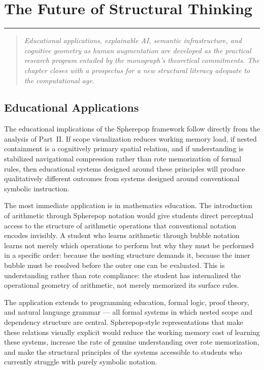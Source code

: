 \documentclass[12pt,openany]{book}
\theoremstyle{plain}
\theoremstyle{definition}
\theoremstyle{remark}
\newcommand{\chapterrule}{%
  \vspace{4pt}%
  {\color{SpherepopBlue}\rule{\textwidth}{0.8pt}}%
  \vspace{10pt}%
}
\newenvironment{chapterprecis}{%
  \begin{quote}\small\itshape}{%
  \end{quote}\medskip}
\begin{document}
\chapter{The Future of Structural Thinking}
\chapterrule

\begin{chapterprecis}
Educational applications, explainable AI, semantic
infrastructure, and cognitive geometry as human augmentation are
developed as the practical research program entailed by the
monograph's theoretical commitments. The chapter closes with a
prospectus for a new structural literacy adequate to the
computational age.
\end{chapterprecis}

\section{Educational Applications}

The educational implications of the Spherepop framework follow directly from the analysis of Part~II. If scope visualization reduces working memory load, if nested containment is a cognitively primary spatial relation, and if understanding is stabilized navigational compression rather than rote memorization of formal rules, then educational systems designed around these principles will produce qualitatively different outcomes from systems designed around conventional symbolic instruction.

The most immediate application is in mathematics education. The introduction of arithmetic through Spherepop notation would give students direct perceptual access to the structure of arithmetic operations that conventional notation encodes invisibly. A student who learns arithmetic through bubble notation learns not merely which operations to perform but why they must be performed in a specific order: because the nesting structure demands it, because the inner bubble must be resolved before the outer one can be evaluated. This is understanding rather than rote compliance: the student has internalized the operational geometry of arithmetic, not merely memorized its surface rules.

The application extends to programming education, formal logic, proof theory, and natural language grammar — all formal systems in which nested scope and dependency structure are central. Spherepop-style representations that make these relations visually explicit would reduce the working memory cost of learning these systems, increase the rate of genuine understanding over rote memorization, and make the structural principles of the systems accessible to students who currently struggle with purely symbolic notation.
\end{document}
